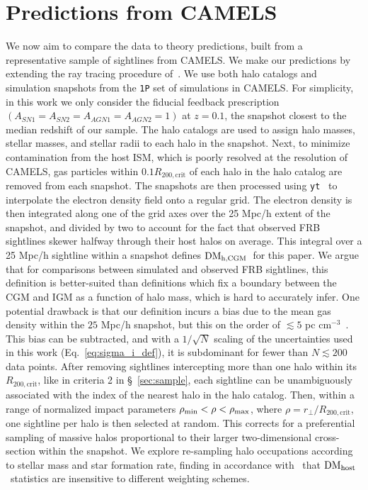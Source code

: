 \documentclass[twocolumn,linenumbers]{aastex631}
\newcommand{\dmh}{\ensuremath{{\rm DM}_\textrm{host}}}
\newcommand{\dmhcgm}{\ensuremath{{\rm DM}_\textrm{h,CGM}}}
\begin{document}
\section{Predictions from CAMELS}\label{sec:camels}
We now aim to compare the data to theory predictions, built from a representative sample of sightlines from CAMELS.
We make our predictions by extending the ray tracing procedure of~\citet{medlock2024probing}.
We use both halo catalogs and simulation snapshots from the \texttt{1P} set of simulations in CAMELS. For simplicity, in this work we only consider the fiducial feedback prescription $(A_{SN1} = A_{SN2} = A_{AGN1} = A_{AGN2} = 1)$ at $z = 0.1$, the snapshot closest to the median redshift of our sample.
The halo catalogs are used to assign halo masses, stellar masses, and stellar radii to each halo in the snapshot.
Next, to minimize contamination from the host ISM, which is poorly resolved at the resolution of CAMELS, gas particles within $0.1 R_\mathrm{200,crit}$ of each halo in the halo catalog are removed from each snapshot.
The snapshots are then processed using \texttt{yt}~\citep{turk2011yt} to interpolate the electron density field onto a regular grid. 
The electron density is then integrated along one of the grid axes over the 25 Mpc/h extent of the snapshot, and divided by two to account for the fact that observed FRB sightlines skewer halfway through their host halos on average.
This integral over a 25 Mpc/h sightline within a snapshot defines \dmhcgm\ for this paper. 
We argue that for comparisons between simulated and observed FRB sightlines, this definition is better-suited than definitions which fix a boundary between the CGM and IGM as a function of halo mass, which is hard to accurately infer. 
One potential drawback is that our definition incurs a bias due to the mean gas density within the $25$ Mpc/h snapshot, but this on the order of $\lesssim 5$ pc cm$^{-3}$~\citep{medlock2024probing}. This bias can be subtracted, and with a $1/\sqrt{N}$ scaling of the uncertainties used in this work (Eq.~\ref{eq:sigma_i_def}), it is subdominant for fewer than $ N \lesssim 200$ data points.
After removing sightlines intercepting more than one halo within its $R_\mathrm{200,crit}$, like in criteria 2 in \S~\ref{sec:sample}, each sightline can be unambiguously associated with the index of the nearest halo in the halo catalog.
Then, within a range of normalized impact parameters $\rho_{\rm min} < \rho < \rho_{\rm max}$, where $\rho = r_\perp/R_\mathrm{200,crit}$, one sightline per halo is then selected at random.
This corrects for a preferential sampling of massive halos proportional to their larger two-dimensional cross-section within the snapshot. We explore re-sampling halo occupations according to stellar mass and star formation rate, finding in accordance with~\citet{theis2024galaxy} that \dmh\ statistics are insensitive to different weighting schemes. 
\end{document}
